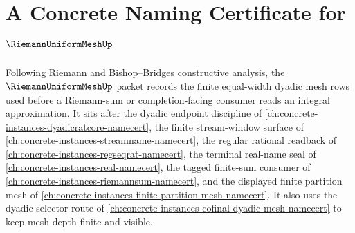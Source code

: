 \chapter{A Concrete Naming Certificate for $\RiemannUniformMeshUp$}
\label{ch:concrete-instances-riemann-uniform-mesh-namecert}

Following Riemann and Bishop--Bridges constructive analysis, the $\RiemannUniformMeshUp$ packet records the finite equal-width dyadic mesh rows used before a Riemann-sum or completion-facing consumer reads an integral approximation. It sits after the dyadic endpoint discipline of \autoref{ch:concrete-instances-dyadicratcore-namecert}, the finite stream-window surface of \autoref{ch:concrete-instances-streamname-namecert}, the regular rational readback of \autoref{ch:concrete-instances-regseqrat-namecert}, the terminal real-name seal of \autoref{ch:concrete-instances-real-namecert}, the tagged finite-sum consumer of \autoref{ch:concrete-instances-riemannsum-namecert}, and the displayed finite partition mesh of \autoref{ch:concrete-instances-finite-partition-mesh-namecert}. It also uses the dyadic selector route of \autoref{ch:concrete-instances-cofinal-dyadic-mesh-namecert} to keep mesh depth finite and visible.

